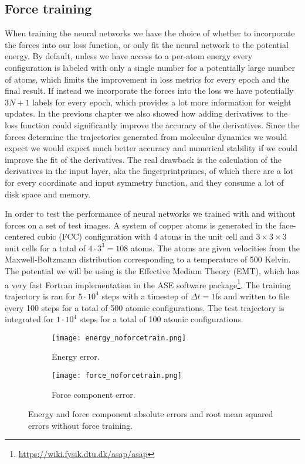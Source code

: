 \subsection{Force training}
When training the neural networks we have the choice of whether
to incorporate the forces into our loss function, or only fit
the neural network to the potential energy. By default, unless
we have access to a per-atom energy every configuration is labeled
with only a single number for a potentially large number of atoms,
which limits the improvement in loss metrics for every epoch
and the final result. If instead we incorporate the forces into the
loss we have potentially $3N + 1$ labels for every epoch,
which provides a lot more information for weight updates.
In the previous chapter we also showed how adding derivatives to
the loss function could significantly improve the accuracy of the
derivatives. Since the forces determine the trajectories generated
from molecular dynamics we would expect we would expect much better
accuracy and numerical stability if we could improve the fit of
the derivatives.
The real drawback is the calculation of the derivatives in the input layer,
aka the fingerprintprimes, of which there are a lot for every coordinate
and input symmetry function, and they consume a lot of disk space and memory.
\par
In order to test the performance of neural networks
we trained with and without forces on a set of test images.
A system of copper atoms is generated in the face-centered cubic (FCC)
configuration with 4 atoms in the unit cell and $3 \times 3 \times 3$
unit cells for a total of $4 \cdot 3^3 = 108$ atoms. The
atoms are given velocities from the Maxwell-Boltzmann distribution
corresponding to a temperature of 500 Kelvin. The potential we will
be using is the Effective Medium Theory (EMT), which has a very
fast Fortran implementation in the ASE software package\footnote{
\url{https://wiki.fysik.dtu.dk/asap/asap}}.
The training trajectory is ran for $5 \cdot 10^4$ steps with
a timestep of $\Delta t = 1$fs and written to file every 100 steps
for a total of 500 atomic configurations. The test trajectory is
integrated for $1 \cdot 10^4$ steps for a total of 100 atomic configurations.

\begin{figure}[H]
\begin{adjustbox}{max width=1.2\linewidth,center}
\centering
  \begin{subfigure}[b]{0.55\textwidth}
      \texttt{[image: energy\_noforcetrain.png]}
      \caption{Energy error.}
    \label{fig:f1}
  \end{subfigure}
  \hfill
  \begin{subfigure}[b]{0.55\textwidth}
      \texttt{[image: force\_noforcetrain.png]}
      \caption{Force component error.}
    \label{fig:f2}
  \end{subfigure}
\end{adjustbox}
\caption{Energy and force component absolute errors and root mean
    squared errors without force training.}
    \label{fig:noforcetrain}
\end{figure}

